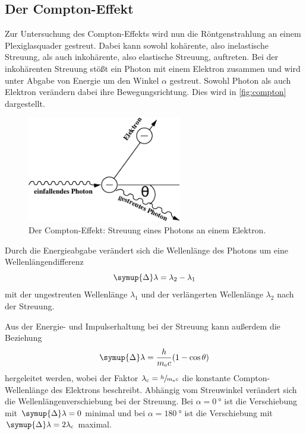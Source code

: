 \subsection{Der Compton-Effekt}
\label{sec:compton_effekt}

    Zur Untersuchung des Compton-Effekts wird nun die Röntgenstrahlung an einem Plexiglasquader gestreut.
    Dabei kann sowohl kohärente, also inelastische Streuung,
    als auch inkohärente, also elastische Streuung,
    auftreten.
    Bei der inkohärenten Streuung stößt ein Photon mit einem Elektron zusammen und wird unter Abgabe von Energie um den Winkel $\alpha$ gestreut.
    Sowohl Photon als auch Elektron verändern dabei ihre Bewegungsrichtung.
    Dies wird in \autoref{fig:compton} dargestellt.
    \begin{figure}[H]
        \centering
        \includegraphics[width=0.6\textwidth]{content/img/Abb_1.pdf}
        \caption{Der Compton-Effekt: Streuung eines Photons an einem Elektron. \cite{versuchsanleitung}}
        \label{fig:compton}
    \end{figure}
    Durch die Energieabgabe verändert sich die Wellenlänge des Photons
    um eine Wellenlängendifferenz
    \begin{equation}
        \symup{\Delta}\lambda = \lambda_2 - \lambda_1
        \label{eqn:wellenlängendifferenz}
    \end{equation}
    mit der ungestreuten Wellenlänge $\lambda_1$ und der verlängerten Wellenlänge $\lambda_2$ nach der Streuung.

    Aus der Energie- und Impulserhaltung bei der Streuung kann außerdem die Beziehung
    \begin{equation}
        \symup{\Delta}\lambda = \frac{h}{m_\text{e} c}(1 - \cos{\theta})
        \label{eqn:verschiebung_winkelabhängig}
    \end{equation}
    hergeleitet werden,
    wobei der Faktor $\lambda_\text{c} = \sfrac{h}{m_\text{e}c}$ die konstante Compton-Wellenlänge des Elektrons beschreibt.
    Abhängig vom Streuwinkel verändert sich die Wellenlängenverschiebung bei der Streuung.
    Bei $\alpha = \SI{0}{\degree}$ ist die Verschiebung mit $\symup{\Delta}\lambda = 0$ minimal und bei $\alpha = \SI{180}{\degree}$ ist die Verschiebung mit $\symup{\Delta}\lambda = 2\lambda_\text{c}$ maximal.
